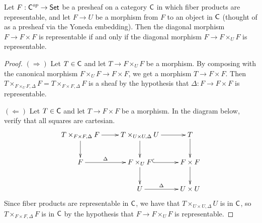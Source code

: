 \begin{lemma} \label{ApdxL:representability_diagonal}
 Let $F:\text{\sf C}^{op}\to \text{\sf Set}$ be a presheaf on a category $\text{\sf C}$ in which fiber products are representable, and let $F\to U$ be a morphism from $F$ to an object in $\text{\sf C}$ (thought of as a presheaf via the Yoneda embedding). Then the diagonal morphism $F\to F\times F$ is representable if and only if the diagonal morphism $F\to F\times_U F$ is representable.
\end{lemma}
\begin{proof}
 $(\Rightarrow)$ Let $T\in \text{\sf C}$ and let $T\to F\times_U F$ be a morphism. By composing with the canonical morphism $F\times_U F\to F\times F$, we get a morphism $T\to F\times F$. Then $T\times_{F\times_U F,\Delta}F = T\times_{F\times F,\Delta} F$ is a sheaf by the hypothesis that $\Delta:F\to F\times F$ is representable.
 
 $(\Leftarrow)$ Let $T\in \text{\sf C}$ and let $T\to F\times F$ be a morphism. In the diagram below, verify that all squares are cartesian.
 \[\xymatrix{
  T\times_{F\times F,\Delta}F \ar[r] \ar[d]
      & T\times_{U\times U,\Delta} U\ar[r]\ar[d]
      & T \ar[d]\\
  F\ar[r]^<>(.5)\Delta & F\times_U F\ar@{^(->}[r]\ar[d] & F\times F\ar[d]\\
  & U\ar[r]^<>(.5)\Delta & U\times U
 }\]
 Since fiber products are representable in $\text{\sf C}$, we have that $T\times_{U\times U,\Delta}U$ is in $\text{\sf C}$, so $T\times_{F\times F,\Delta}F$ is in $\text{\sf C}$ by the hypothesis that $F\to F\times_U F$ is representable.
\end{proof}

